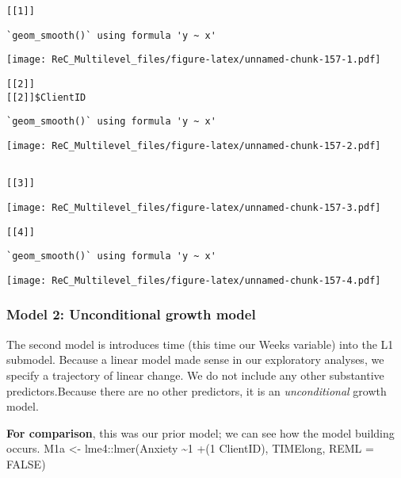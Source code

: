 \documentclass[
  11pt,
]{book}
\begin{document}
\begin{verbatim}
[[1]]
\end{verbatim}

\begin{verbatim}
`geom_smooth()` using formula 'y ~ x'
\end{verbatim}

\texttt{[image: ReC\_Multilevel\_files/figure-latex/unnamed-chunk-157-1.pdf]}

\begin{verbatim}
[[2]]
[[2]]$ClientID
\end{verbatim}

\begin{verbatim}
`geom_smooth()` using formula 'y ~ x'
\end{verbatim}

\texttt{[image: ReC\_Multilevel\_files/figure-latex/unnamed-chunk-157-2.pdf]}

\begin{verbatim}

[[3]]
\end{verbatim}

\texttt{[image: ReC\_Multilevel\_files/figure-latex/unnamed-chunk-157-3.pdf]}

\begin{verbatim}
[[4]]
\end{verbatim}

\begin{verbatim}
`geom_smooth()` using formula 'y ~ x'
\end{verbatim}

\texttt{[image: ReC\_Multilevel\_files/figure-latex/unnamed-chunk-157-4.pdf]}

\hypertarget{model-2-unconditional-growth-model}{%
\subsubsection{Model 2: Unconditional growth model}\label{model-2-unconditional-growth-model}}

The second model is introduces time (this time our Weeks variable) into the L1 submodel. Because a linear model made sense in our exploratory analyses, we specify a trajectory of linear change. We do not include any other substantive predictors.Because there are no other predictors, it is an \emph{unconditional} growth model.

\textbf{For comparison}, this was our prior model; we can see how the model building occurs.
M1a \textless- lme4::lmer(Anxiety \textasciitilde1 +(1 \textbar{} ClientID), TIMElong, REML = FALSE)
\end{document}
